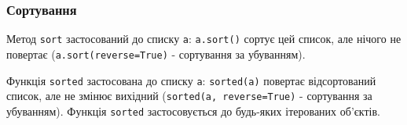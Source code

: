 \begin{frame}
\frametitle{Сортування} 
Метод \texttt{sort} застосований до списку \texttt{a}: \texttt{a.sort()}  сортує цей список, але нічого не повертає (\texttt{a.sort(reverse=True)} - сортування за убуванням).

Функція \texttt{sorted} застосована до списку \texttt{a}: \texttt{sorted(a)}  повертає відсортований список, але не змінює вихідний (\texttt{sorted(a, reverse=True)} - сортування за убуванням). Функція \texttt{sorted} застосовується до будь-яких ітерованих об'єктів.

\end{frame}
